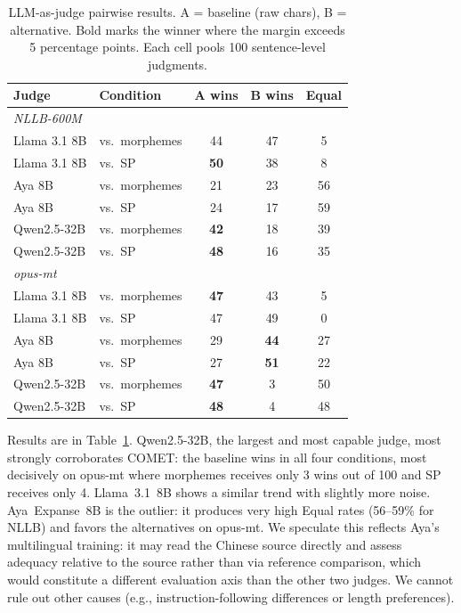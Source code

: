 \documentclass[11pt]{article}
\begin{document}
\begin{table}[t]
\centering
\small
\begin{tabular}{llccc}
\toprule
\textbf{Judge} & \textbf{Condition} & \textbf{A wins} & \textbf{B wins} & \textbf{Equal} \\
\midrule
\multicolumn{5}{l}{\textit{NLLB-600M}} \\
Llama 3.1 8B  & vs.\ morphemes & 44 & 47 & 5  \\
Llama 3.1 8B  & vs.\ SP        & \textbf{50} & 38 & 8  \\
Aya 8B        & vs.\ morphemes & 21 & 23 & 56 \\
Aya 8B        & vs.\ SP        & 24 & 17 & 59 \\
Qwen2.5-32B   & vs.\ morphemes & \textbf{42} & 18 & 39 \\
Qwen2.5-32B   & vs.\ SP        & \textbf{48} & 16 & 35 \\
\midrule
\multicolumn{5}{l}{\textit{opus-mt}} \\
Llama 3.1 8B  & vs.\ morphemes & \textbf{47} & 43 & 5  \\
Llama 3.1 8B  & vs.\ SP        & 47 & 49 & 0  \\
Aya 8B        & vs.\ morphemes & 29 & \textbf{44} & 27 \\
Aya 8B        & vs.\ SP        & 27 & \textbf{51} & 22 \\
Qwen2.5-32B   & vs.\ morphemes & \textbf{47} &  3 & 50 \\
Qwen2.5-32B   & vs.\ SP        & \textbf{48} &  4 & 48 \\
\bottomrule
\end{tabular}
\caption{LLM-as-judge pairwise results. A = baseline (raw chars), B = alternative. Bold marks the winner where the margin exceeds 5 percentage points. Each cell pools 100 sentence-level judgments.}
\label{tab:llm_judge}
\end{table}

Results are in Table~\ref{tab:llm_judge}. Qwen2.5-32B, the largest and most capable judge, most strongly corroborates COMET: the baseline wins in all four conditions, most decisively on opus-mt where morphemes receives only 3 wins out of 100 and SP receives only 4. Llama~3.1~8B shows a similar trend with slightly more noise. Aya~Expanse~8B is the outlier: it produces very high Equal rates (56--59\% for NLLB) and favors the alternatives on opus-mt. We speculate this reflects Aya's multilingual training: it may read the Chinese source directly and assess adequacy relative to the source rather than via reference comparison, which would constitute a different evaluation axis than the other two judges. We cannot rule out other causes (e.g., instruction-following differences or length preferences).
\end{document}
